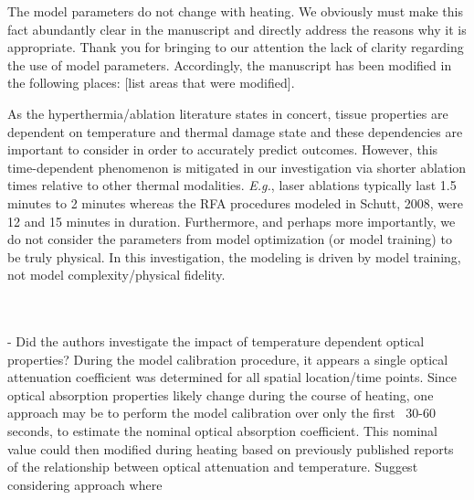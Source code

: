 \documentclass[letterpaper,12pt]{report}
\begin{document}
{\color{red}
The model parameters do not change with heating. We obviously must make this fact abundantly clear in the
manuscript and directly address the reasons why it is appropriate. Thank you for bringing to our attention
the lack of clarity regarding the use of model parameters. Accordingly, the manuscript has been
modified in the following places:
{\color{green}[list areas that were modified]}.

As the hyperthermia/ablation literature states in concert, tissue properties are dependent on temperature
and thermal damage state and these dependencies are important to consider in order to accurately predict
outcomes. However, this time-dependent phenomenon is mitigated in our investigation via shorter ablation
times relative to other thermal modalities. \textit{E.g.}, laser ablations typically last 1.5 minutes to 2 minutes
whereas the RFA procedures modeled in Schutt, 2008, were 12 and 15 minutes in duration. Furthermore, and
perhaps more importantly, we do not consider the parameters from model optimization (or model
training) to be truly physical. In this investigation, the modeling is driven by model training, not model
complexity/physical fidelity. 
}\\
\\
- Did the authors investigate the impact of temperature dependent optical properties? During the model
calibration procedure, it appears a single optical attenuation coefficient was determined for all spatial
location/time points. Since optical absorption properties likely change during the course of heating,
one approach may be to perform the model calibration over only the first ~30-60 seconds, to estimate the
nominal optical absorption coefficient. This nominal value could then modified during heating based on
previously published reports of the relationship between optical attenuation and temperature. Suggest
considering approach where
\end{document}
